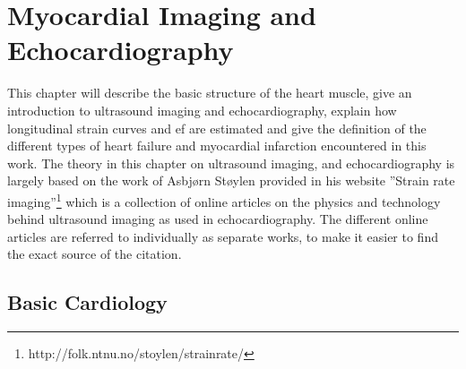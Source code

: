\chapter{Myocardial Imaging and Echocardiography} \label{chap:strain}

This chapter will describe the basic structure of the heart muscle, give an introduction to ultrasound imaging and echocardiography, explain how longitudinal strain curves and \acrfull{ef} are estimated and give the definition of the different types of heart failure and myocardial infarction encountered in this work. The theory in this chapter on ultrasound imaging, and echocardiography is largely based on the work of Asbjørn Støylen provided in his website ''Strain rate imaging''\footnote{http://folk.ntnu.no/stoylen/strainrate/} which is a collection of online articles on the physics and technology behind ultrasound imaging as used in echocardiography. The different online articles are referred to individually as separate works, to make it easier to find the exact source of the citation.

\section{Basic Cardiology}

